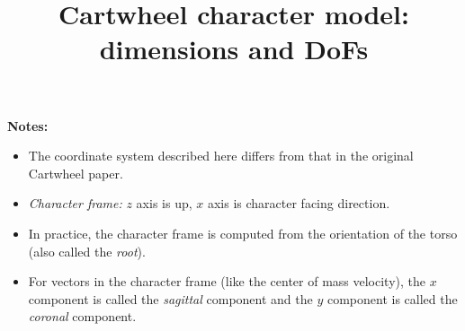 \documentclass[a4paper]{article}
\title{Cartwheel character model: dimensions and DoFs}
\begin{document}



\pgfmathsetmacro{\shankSizeZ}{\legSizeZ * \kneeRelativePosZ}
\pgfmathsetmacro{\thighSizeZ}{\legSizeZ - \shankSizeZ}

\pgfmathsetmacro{\anklePosZ}{\footSizeZ}
\pgfmathsetmacro{\kneePosZ}{\anklePosZ + \legSizeZ * \kneeRelativePosZ}
\pgfmathsetmacro{\hipPosZ}{\anklePosZ + \legSizeZ}


\maketitle
\textbf{Notes:}
\begin{itemize}
\item The coordinate system described here differs from that in the original Cartwheel paper.
\item \textit{Character frame:} $z$ axis is up, $x$ axis is character facing direction.
\item In practice, the character frame is computed from the orientation of the torso (also called the \textit{root}).
\item For vectors in the character frame (like the center of mass velocity), the $x$ component is called the \textit{sagittal} component and the $y$ component is called the \textit{coronal} component.
\end{itemize}
\end{document}
